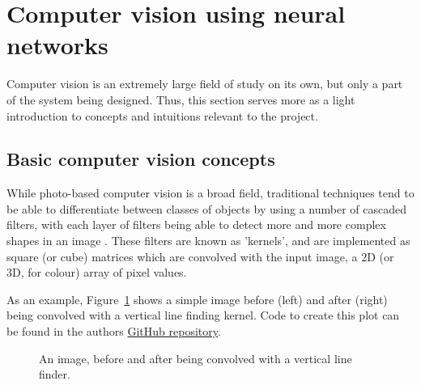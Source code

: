 \section{Computer vision using neural networks}

Computer vision is an extremely large field of study on its own, but only a part of the system being designed. Thus, this section serves more as a light introduction to concepts and intuitions relevant to the project.

\subsection{Basic computer vision concepts}
While photo-based computer vision is a broad field, traditional techniques tend to be able to differentiate between classes of objects by using a number of cascaded filters, with each layer of filters being able to detect more and more complex shapes in an image \cite{website:cs231n_CNNs}. These filters are known as 'kernels', and are implemented as square (or cube) matrices which are convolved with the input image, a 2D (or 3D, for colour) array of pixel values.

As an example, Figure~\ref{fig:input_output_simple_filter} shows a simple image before (left) and after (right) being convolved with a vertical line finding kernel. Code to create this plot can be found in the authors \href{https://github.com/alknemeyer/EEE4022S-Thesis-Project/blob/master/Final%20code/Illustrations%20for%20report.ipynb}{GitHub repository}.

\begin{figure}[h!]%
    \centering
    \qquad \qquad
    \caption{An image, before and after being convolved with a vertical line finder.}%
    \label{fig:input_output_simple_filter}%
\end{figure}

